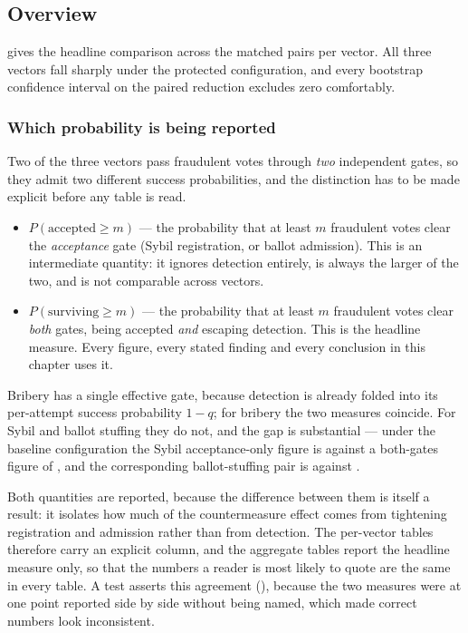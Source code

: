 \subsection{Overview}

 gives the headline comparison across the
\TotalTrials{} matched pairs per vector. All three vectors fall sharply
under the protected configuration, and every bootstrap confidence
interval on the paired reduction excludes zero comfortably.



\subsubsection*{Which probability is being reported}
\label{sec:findings-measures}

Two of the three vectors pass fraudulent votes through \emph{two}
independent gates, so they admit two different success probabilities,
and the distinction has to be made explicit before any table is read.

\begin{itemize}\setlength{\itemsep}{2pt}
\item $P(\text{accepted} \geq m)$ --- the probability that at least $m$
fraudulent votes clear the \emph{acceptance} gate (Sybil registration,
or ballot admission). This is an intermediate quantity: it ignores
detection entirely, is always the larger of the two, and is not
comparable across vectors.
\item $P(\text{surviving} \geq m)$ --- the probability that at least
$m$ fraudulent votes clear \emph{both} gates, being accepted
\emph{and} escaping detection. This is the headline measure. Every
figure, every stated finding and every conclusion in this chapter uses
it.
\end{itemize}

Bribery has a single effective gate, because detection is already
folded into its per-attempt success probability $1-q$; for bribery the
two measures coincide. For Sybil and ballot stuffing they do not, and
the gap is substantial --- under the baseline configuration the Sybil
acceptance-only figure is \SybilAcceptedBaseline{} against a
both-gates figure of \SybilBaseline{}, and the corresponding
ballot-stuffing pair is \BallotStuffingAcceptedBaseline{} against
\BallotStuffingBaseline{}.

Both quantities are reported, because the difference between them is
itself a result: it isolates how much of the countermeasure effect
comes from tightening registration and admission rather than from
detection. The per-vector tables therefore carry an explicit
 column, and the aggregate tables report the headline
measure only, so that the numbers a reader is most likely to quote are
the same in every table. A test asserts this agreement
(), because the two
measures were at one point reported side by side without being named,
which made correct numbers look inconsistent.


